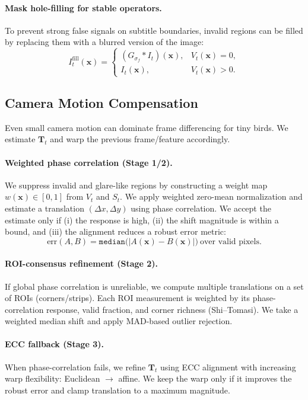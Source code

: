 \paragraph{Mask hole-filling for stable operators.}
To prevent strong false signals on subtitle boundaries, invalid regions can be filled by replacing them with a blurred version of the image:
\begin{equation}
I^{\text{fill}}_t(\mathbf{x})=
\begin{cases}
(G_{\sigma_f}\ast I_t)(\mathbf{x}), & V_t(\mathbf{x})=0,\\
I_t(\mathbf{x}), & V_t(\mathbf{x})>0.
\end{cases}
\end{equation}

\subsection{Camera Motion Compensation}
Even small camera motion can dominate frame differencing for tiny birds. We estimate $\mathbf{T}_t$ and warp the previous frame/feature accordingly.

\paragraph{Weighted phase correlation (Stage 1/2).}
We suppress invalid and glare-like regions by constructing a weight map $w(\mathbf{x})\in[0,1]$ from $V_t$ and $S_t$.
We apply weighted zero-mean normalization and estimate a translation $(\Delta x,\Delta y)$ using phase correlation.
We accept the estimate only if (i) the response is high, (ii) the shift magnitude is within a bound, and (iii) the alignment reduces a robust error metric:
\begin{equation}
\text{err}(A,B) = \texttt{median}\big(|A(\mathbf{x})-B(\mathbf{x})|\big)\ \text{over valid pixels.}
\end{equation}

\paragraph{ROI-consensus refinement (Stage 2).}
If global phase correlation is unreliable, we compute multiple translations on a set of ROIs (corners/strips). Each ROI measurement is weighted by
its phase-correlation response, valid fraction, and corner richness (Shi--Tomasi). We take a weighted median shift and apply MAD-based outlier rejection.

\paragraph{ECC fallback (Stage 3).}
When phase-correlation fails, we refine $\mathbf{T}_t$ using ECC alignment with increasing warp flexibility:
Euclidean $\rightarrow$ affine. We keep the warp only if it improves the robust error and clamp translation to a maximum magnitude.


